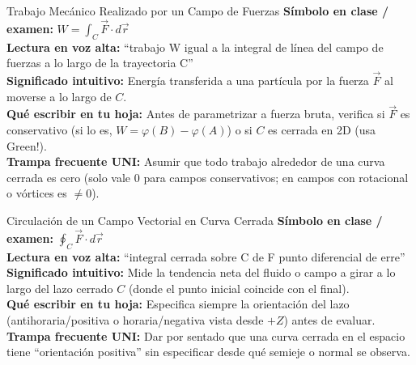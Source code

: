 \documentclass[11pt,a4paper]{article}
\begin{document}
\begin{definicionbox}{Trabajo Mecánico Realizado por un Campo de Fuerzas}
\textbf{Símbolo en clase / examen:} $W = \int_C \vec{F} \cdot d\vec{r}$\\[0.15cm]
\textbf{Lectura en voz alta:} ``trabajo W igual a la integral de línea del campo de fuerzas a lo largo de la trayectoria C''\\[0.12cm]
\textbf{Significado intuitivo:} Energía transferida a una partícula por la fuerza $\vec{F}$ al moverse a lo largo de $C$.\\[0.12cm]
\textbf{Qué escribir en tu hoja:} Antes de parametrizar a fuerza bruta, verifica si $\vec{F}$ es conservativo (si lo es, $W = \varphi(B)-\varphi(A)$) o si $C$ es cerrada en 2D (usa Green!).\\[0.12cm]
\textbf{Trampa frecuente UNI:} Asumir que todo trabajo alrededor de una curva cerrada es cero (solo vale $0$ para campos conservativos; en campos con rotacional o vórtices es $\neq 0$).
\end{definicionbox}

\begin{definicionbox}{Circulación de un Campo Vectorial en Curva Cerrada}
\textbf{Símbolo en clase / examen:} $\oint_C \vec{F} \cdot d\vec{r}$\\[0.15cm]
\textbf{Lectura en voz alta:} ``integral cerrada sobre C de F punto diferencial de erre''\\[0.12cm]
\textbf{Significado intuitivo:} Mide la tendencia neta del fluido o campo a girar a lo largo del lazo cerrado $C$ (donde el punto inicial coincide con el final).\\[0.12cm]
\textbf{Qué escribir en tu hoja:} Especifica siempre la orientación del lazo (antihoraria/positiva o horaria/negativa vista desde $+Z$) antes de evaluar.\\[0.12cm]
\textbf{Trampa frecuente UNI:} Dar por sentado que una curva cerrada en el espacio tiene ``orientación positiva'' sin especificar desde qué semieje o normal se observa.
\end{definicionbox}
\end{document}
